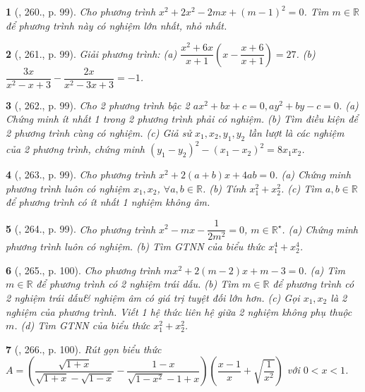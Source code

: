 \documentclass{article}
\newtheorem{baitoan}{}
\begin{document}
\begin{baitoan}[\cite{Tuyen_Toan_9_old}, 260., p. 99]
	Cho phương trình $x^2 + 2x^2 - 2mx + (m - 1)^2 = 0$. Tìm $m\in\mathbb{R}$ để phương trình này có nghiệm lớn nhất, nhỏ nhất.
\end{baitoan}

\begin{baitoan}[\cite{Tuyen_Toan_9_old}, 261., p. 99]
	Giải phương trình: (a) $\dfrac{x^2 + 6x}{x + 1}\left(x - \dfrac{x + 6}{x + 1}\right) = 27$. (b) $\dfrac{3x}{x^2 - x + 3} - \dfrac{2x}{x^2 - 3x + 3} = -1$.
\end{baitoan}

\begin{baitoan}[\cite{Tuyen_Toan_9_old}, 262., p. 99]
	Cho 2 phương trình bậc 2 $ax^2 + bx + c = 0,ay^2 + by - c = 0$. (a) Chứng minh ít nhất 1 trong 2 phương trình phải có nghiệm. (b) Tìm điều kiện để 2 phương trình cùng có nghiệm. (c) Giả sử $x_1,x_2,y_1,y_2$ lần lượt là các nghiệm của 2 phương trình, chứng minh $(y_1 - y_2)^2 - (x_1 - x_2)^2 = 8x_1x_2$.
\end{baitoan}

\begin{baitoan}[\cite{Tuyen_Toan_9_old}, 263., p. 99]
	Cho phương trình $x^2 + 2(a + b)x + 4ab = 0$. (a) Chứng minh phương trình luôn có nghiệm $x_1,x_2$, $\forall a,b\in\mathbb{R}$. (b) Tính $x_1^2 + x_2^2$. (c) Tìm $a,b\in\mathbb{R}$ để phương trình có ít nhất 1 nghiệm không âm.
\end{baitoan}

\begin{baitoan}[\cite{Tuyen_Toan_9_old}, 264., p. 99]
	Cho phương trình $x^2 - mx - \dfrac{1}{2m^2} = 0$, $m\in\mathbb{R}^\star$. (a) Chứng minh phương trình luôn có nghiệm. (b) Tìm {\rm GTNN} của biểu thức $x_1^4 + x_2^4$.
\end{baitoan}

\begin{baitoan}[\cite{Tuyen_Toan_9_old}, 265., p. 100]
	Cho phương trình $mx^2 + 2(m - 2)x + m - 3 = 0$. (a) Tìm $m\in\mathbb{R}$ để phương trình có 2 nghiệm trái dấu. (b) Tìm $m\in\mathbb{R}$ để phương trình có 2 nghiệm trái dấu\& nghiệm âm có giá trị tuyệt đối lớn hơn. (c) Gọi $x_1,x_2$ là 2 nghiệm của phương trình. Viết 1 hệ thức liên hệ giữa 2 nghiệm không phụ thuộc $m$. (d) Tìm {\rm GTNN} của biểu thức $x_1^2 + x_2^2$.
\end{baitoan}

\begin{baitoan}[\cite{Tuyen_Toan_9_old}, 266., p. 100]
	Rút gọn biểu thức $A = \left(\dfrac{\sqrt{1 + x}}{\sqrt{1 + x} - \sqrt{1 - x}} - \dfrac{1 - x}{\sqrt{1 - x^2} - 1 + x}\right)$$\left(\dfrac{x - 1}{x} + \sqrt{\dfrac{1}{x^2}}\right)$ với $0 < x < 1$.
\end{baitoan}
\end{document}
